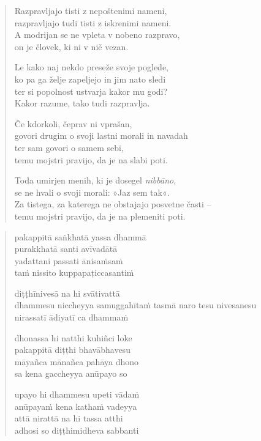 \begin{verse}


Razpravljajo tisti z nepoštenimi nameni,\\
razpravljajo tudi tisti z iskrenimi nameni.\\
A modrijan se ne vpleta v nobeno razpravo,\\
on je človek, ki ni v nič vezan.

Le kako naj nekdo preseže svoje poglede,\\
ko pa ga želje zapeljejo in jim nato sledi\\
ter si popolnost ustvarja kakor mu godi?\\
Kakor razume, tako tudi razpravlja.

Če kdorkoli, čeprav ni vprašan,\\
govori drugim o svoji lastni morali in navadah\\
ter sam govori o samem sebi,\\
temu mojstri pravijo, da je na slabi poti.

Toda umirjen menih, ki je dosegel \emph{nibbāno},\\
se ne hvali o svoji morali: »Jaz sem tak«.\\
Za tistega, za katerega ne obstajajo posvetne časti --\\
temu mojstri pravijo, da je na plemeniti poti.

\end{verse}


\clearpage
\begin{verse}

pakappitā saṅkhatā yassa dhammā\\
purakkhatā santi avīvadātā\\
yadattani passati ānisaṁsaṁ\\
taṁ nissito kuppapaṭiccasantiṁ

diṭṭhīnivesā na hi svātivattā\\
dhammesu niccheyya samuggahītaṁ
tasmā naro tesu nivesanesu\\
nirassatī ādiyatī ca dhammaṁ

dhonassa hi natthi kuhiñci loke\\
pakappitā diṭṭhi bhavābhavesu\\
māyañca mānañca pahāya dhono\\
sa kena gaccheyya anūpayo so

upayo hi dhammesu upeti vādaṁ\\
anūpayaṁ kena kathaṁ vadeyya\\
attā nirattā na hi tassa atthi\\
adhosi so diṭṭhimidheva sabbanti

\end{verse}

